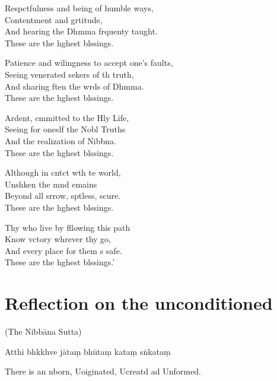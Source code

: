 Respctfulness and being of humble ways,\\
Contentment and grtitude,\\
And hearing the Dhmma frquenty taught.\\
These are the hghest blssings.

Patience and wilingness to accept one's faults,\\
Seeing venerated sekers of th truth,\\
And sharing ften the wrds of Dhmma.\\
These are the hghest blssings.

Ardent, cmmitted to the Hly Life,\\
Seeing for oneslf the Nobl Truths\\
And the realization of Nibbna.\\
These are the hghest blssings.

Although in cntct wth te world,\\
Unshken the mnd emains\\
Beyond all srrow, sptless, scure.\\
These are the hghest blssings.

Thy who live by fllowing this path\\
Know vctory whrever thy go,\\
And every place for them s safe.\\
These are the hghest blssings.'

\chapter[The unconditioned]{Reflection on the unconditioned}

(The Nibbāna Sutta)

\begin{leader}
\end{leader}

Atthi bhkkhve jātaṃ bhūtaṃ kataṃ sṅkataṃ

\begin{english}
  There is an nborn, Uoiginated, Ucreatd ad Unformed.
\end{english}

